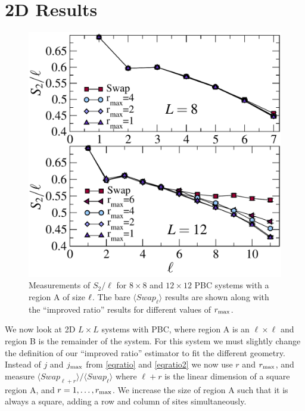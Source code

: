 \section{2D Results}

\begin{figure} {
	\includegraphics[width=6in]{./figures/paper2/fig_2DA/L8n12_ratio.pdf} 
	\caption[$S_2$ in an $8 \times 8$ and $12 \times 12$ system]{ 
	Measurements of $S_2/\ell$ for $8 \times 8$ and $12 \times 12$ PBC systems with a region A of size $\ell \time \ell$.
	The bare $\langle Swap_\ell \rangle$ results are shown along with the ``improved ratio'' results for different values of $r_{\rm max}$.
	\label{2Dfig}
	}
} \end{figure}

We now look at 2D $L\times L$ systems with PBC, where region A is an $\ell \times \ell$ and region B is the remainder of the system.
For this system we must slightly change the definition of our ``improved ratio'' estimator to fit the different geometry.
Instead of $j$ and $j_{\rm max}$ from \eqref{eqratio} and \eqref{eqratio2} we now use $r$ and $r_{\rm max}$, and measure $\langle Swap_{\ell+r}\rangle / \langle Swap_{\ell}\rangle$ where $\ell +r$ is the linear dimension of a square region A, and $r=1,\dots,r_{\rm max}$.
We increase the size of region A such that it is always a square, adding a row and column of sites simultaneously.

